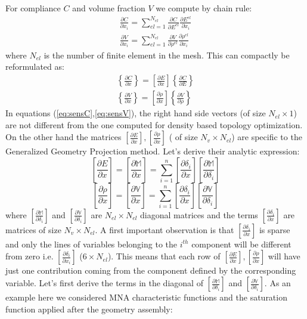 For compliance $C$ and volume fraction $V$ we compute by chain rule:
\begin{eqnarray}
\frac{\partial C}{\partial x_i}=\sum_{el=1}^{N_{el}}{\frac{\partial C}{\partial E^{el}}\frac{\partial E^{el}}{\partial x_i}}\\
\frac{\partial V}{\partial x_i}=\sum_{el=1}^{N_{el}}{\frac{\partial V}{\partial \rho^{el}}\frac{\partial \rho^{el}}{\partial x_i}}
\end{eqnarray}
where $N_{el}$ is the number of finite element in the mesh. This can compactly be reformulated as:
\begin{eqnarray}
\label{eq:sensC}
\left\lbrace\frac{\partial C}{\partial x}\right\rbrace=\left[\frac{\partial E}{\partial x}\right]\left\lbrace\frac{\partial C}{\partial E}\right\rbrace\\
\left\lbrace\frac{\partial V}{\partial x}\right\rbrace=\left[\frac{\partial \rho}{\partial x}\right]\left\lbrace\frac{\partial V}{\partial\rho}\right\rbrace
\label{eq:sensV}
\end{eqnarray}
In equations (\ref{eq:sensC},\ref{eq:sensV}), the right hand side vectors (of size $N_{el}\times 1$) are not different from the one computed for density based topology optimization. On the other hand the matrices $\left[\frac{\partial E}{\partial x}\right],\left[\frac{\partial \rho}{\partial x}\right]$ ( of size $N_v\times N_{el}$) are specific to the Generalized Geometry Projection method.  Let's derive their analytic expression:
\begin{equation}
    \left[\frac{\partial E}{\partial x}\right]=\left[\frac{\partial \mathbb{M}}{\partial x}\right]=\sum_{i=1}^n{\left[\frac{\partial \delta_i}{\partial x}\right]\left[\frac{\partial \mathbb{M}}{\partial \delta_i}\right]}
\end{equation}
\begin{equation}
    \left[\frac{\partial \rho}{\partial x}\right]=\left[\frac{\partial \mathbb{V}}{\partial x}\right]=\sum_{i=1}^n{\left[\frac{\partial \delta_i}{\partial x}\right]\left[\frac{\partial \mathbb{V}}{\partial \delta_i}\right]}
\end{equation}
where $\left[\frac{\partial \mathbb{M}}{\partial \delta_i}\right]$ and $\left[\frac{\partial \mathbb{V}}{\partial \delta_i}\right]$ are $N_{el}\times N_{el}$ diagonal matrices and the terms $\left[\frac{\partial \delta_i}{\partial x}\right]$ are matrices of size  $N_v\times N_{el}$. A first important observation is that $\left[\frac{\partial \delta_i}{\partial x}\right]$ is sparse and only the lines of variables belonging to the $i^{th}$ component will be different from zero i.e. $\left[\frac{\partial \delta_i}{\partial x_i}\right]$ ($6\times N_{el}$). This means that each row of $\left[\frac{\partial E}{\partial x}\right],\left[\frac{\partial \rho}{\partial x}\right]$ will have just one contribution coming from the component defined by the corresponding variable. Let's first derive the terms in the diagonal of $\left[\frac{\partial \mathbb{M}}{\partial \delta_i}\right]$ and $\left[\frac{\partial \mathbb{V}}{\partial \delta_i}\right]$. As an example here we considered MNA characteristic functions and the saturation function applied after the geometry assembly:
